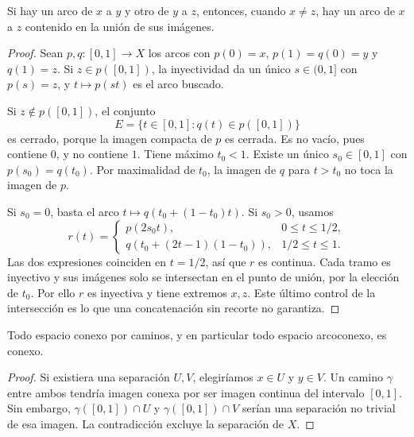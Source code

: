 \begin{lema}\label{ch18:recorte}
Si hay un arco de $x$ a $y$ y otro de $y$ a $z$, entonces, cuando $x\ne z$, hay un arco de $x$ a $z$ contenido en la unión de sus imágenes.
\end{lema}
\begin{proof}
Sean $p,q:[0,1]\to X$ los arcos con $p(0)=x$, $p(1)=q(0)=y$ y $q(1)=z$. Si $z\in p([0,1])$, la inyectividad da un único $s\in(0,1]$ con $p(s)=z$, y $t\mapsto p(st)$ es el arco buscado.

Si $z\notin p([0,1])$, el conjunto
\[
E=\{t\in[0,1]:q(t)\in p([0,1])\}
\]
es cerrado, porque la imagen compacta de $p$ es cerrada. Es no vacío, pues contiene $0$, y no contiene $1$. Tiene máximo $t_0<1$. Existe un único $s_0\in[0,1]$ con $p(s_0)=q(t_0)$. Por maximalidad de $t_0$, la imagen de $q$ para $t>t_0$ no toca la imagen de $p$.

Si $s_0=0$, basta el arco $t\mapsto q(t_0+(1-t_0)t)$. Si $s_0>0$, usamos
\[
r(t)=\begin{cases}
p(2s_0t),&0\le t\le1/2,\\
q(t_0+(2t-1)(1-t_0)),&1/2\le t\le1.
\end{cases}
\]
Las dos expresiones coinciden en $t=1/2$, así que $r$ es continua. Cada tramo es inyectivo y sus imágenes solo se intersectan en el punto de unión, por la elección de $t_0$. Por ello $r$ es inyectiva y tiene extremos $x,z$. Este último control de la intersección es lo que una concatenación sin recorte no garantiza.
\end{proof}

\begin{proposicion}\label{ch18:arcoimplica}
Todo espacio conexo por caminos, y en particular todo espacio arcoconexo, es conexo.
\end{proposicion}
\begin{proof}
Si existiera una separación $U,V$, elegiríamos $x\in U$ y $y\in V$. Un camino $\gamma$ entre ambos tendría imagen conexa por ser imagen continua del intervalo $[0,1]$. Sin embargo, $\gamma([0,1])\cap U$ y $\gamma([0,1])\cap V$ serían una separación no trivial de esa imagen. La contradicción excluye la separación de $X$.
\end{proof}

